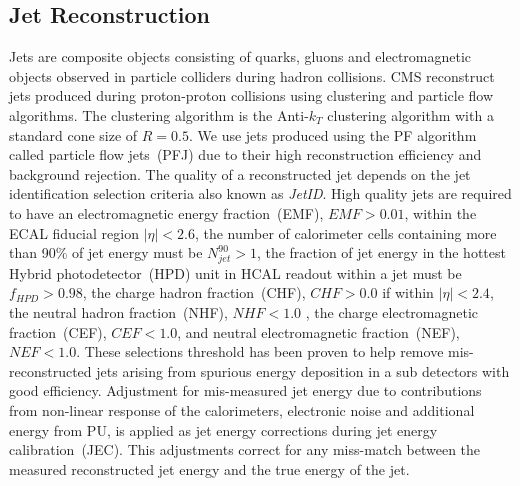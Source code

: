 \subsection{Jet Reconstruction}
Jets are composite objects consisting of quarks, gluons and electromagnetic objects observed in particle colliders during hadron collisions. CMS reconstruct jets produced during proton-proton collisions using clustering and particle flow algorithms.
The clustering algorithm is the Anti-$k_{T}$ clustering algorithm with a standard cone size of $R = 0.5$.
We use jets produced using the PF algorithm called particle flow jets~(PFJ) due to their high reconstruction efficiency and background rejection.
The quality of a reconstructed jet depends on the jet identification selection criteria also known as \textit{JetID}.
High quality jets are required to have an electromagnetic energy fraction~(EMF), $EMF > 0.01$,  within the ECAL fiducial region $|\eta| < 2.6$, the number of calorimeter cells containing more than 90\% of jet energy  must be $N^{90}_{jet} > 1$, the fraction of jet energy in the hottest  Hybrid photodetector~(HPD) unit  in HCAL readout within a jet must be $f_{HPD} > 0.98$, the charge  hadron fraction~(CHF), $CHF >0.0$ if within $|\eta| < 2.4$, the neutral hadron fraction~(NHF), $NHF < 1.0$ , the charge electromagnetic fraction~(CEF), $CEF < 1.0$, and neutral electromagnetic fraction~(NEF), $NEF < 1.0 $. These selections threshold has been proven to help remove mis-reconstructed jets arising from spurious energy deposition in a sub detectors with good efficiency.
Adjustment for mis-measured jet energy due to contributions from non-linear response of the calorimeters, electronic noise and additional energy from PU, is applied as jet energy corrections during jet energy calibration~(JEC). This adjustments correct for any miss-match between the measured reconstructed jet energy and the true energy of the jet. 


